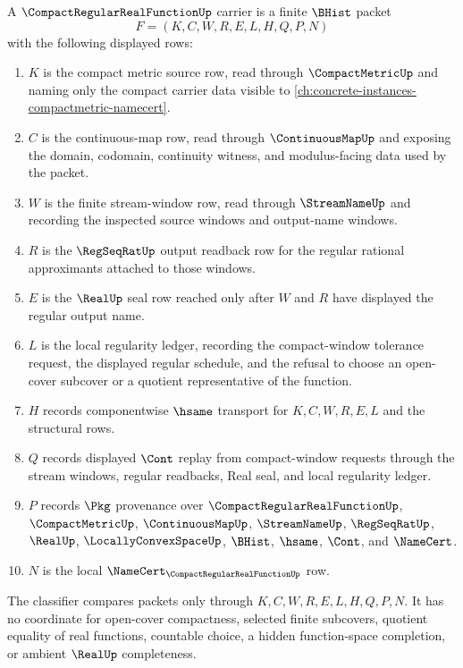 \begin{definition}
\label{def:compact-regular-real-function-carrier}
A $\CompactRegularRealFunctionUp$ carrier is a finite $\BHist$ packet
$$
F=(K,C,W,R,E,L,H,Q,P,N)
$$
with the following displayed rows:
\begin{enumerate}
\item $K$ is the compact metric source row, read through $\CompactMetricUp$ and naming only the compact carrier data visible to \autoref{ch:concrete-instances-compactmetric-namecert}.
\item $C$ is the continuous-map row, read through $\ContinuousMapUp$ and exposing the domain, codomain, continuity witness, and modulus-facing data used by the packet.
\item $W$ is the finite stream-window row, read through $\StreamNameUp$ and recording the inspected source windows and output-name windows.
\item $R$ is the $\RegSeqRatUp$ output readback row for the regular rational approximants attached to those windows.
\item $E$ is the $\RealUp$ seal row reached only after $W$ and $R$ have displayed the regular output name.
\item $L$ is the local regularity ledger, recording the compact-window tolerance request, the displayed regular schedule, and the refusal to choose an open-cover subcover or a quotient representative of the function.
\item $H$ records componentwise $\hsame$ transport for $K,C,W,R,E,L$ and the structural rows.
\item $Q$ records displayed $\Cont$ replay from compact-window requests through the stream windows, regular readbacks, Real seal, and local regularity ledger.
\item $P$ records $\Pkg$ provenance over $\CompactRegularRealFunctionUp$, $\CompactMetricUp$, $\ContinuousMapUp$, $\StreamNameUp$, $\RegSeqRatUp$, $\RealUp$, $\LocallyConvexSpaceUp$, $\BHist$, $\hsame$, $\Cont$, and $\NameCert$.
\item $N$ is the local $\NameCert_{\CompactRegularRealFunctionUp}$ row.
\end{enumerate}
The classifier compares packets only through $K,C,W,R,E,L,H,Q,P,N$. It has no coordinate for open-cover compactness, selected finite subcovers, quotient equality of real functions, countable choice, a hidden function-space completion, or ambient $\RealUp$ completeness.
\end{definition}

